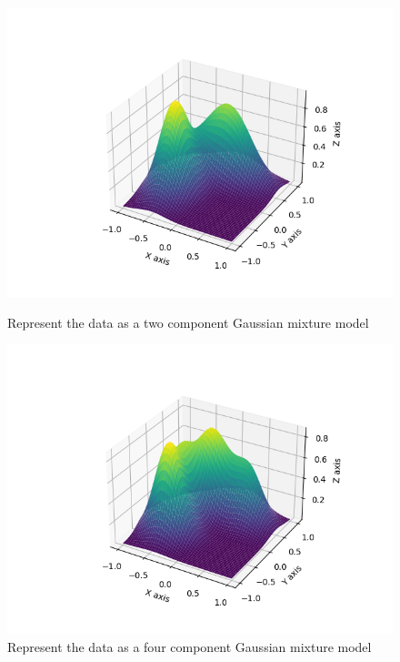 \documentclass{article}
\begin{document}
\begin{figure}[!htb]
\begin{minipage}{0.49\textwidth}
			\includegraphics[width=1\linewidth]{../q1to6pics/q6_2.png}
			\caption{Represent the data as a two component Gaussian mixture model}
	\end{minipage}\hfill
	\centering
	\begin{minipage}{0.49\textwidth}
			\centering
			\includegraphics[width=1\linewidth]{../q1to6pics/q6_4.png}
			\caption{Represent the data as a four component Gaussian mixture model}
	\end{minipage}\hfill
\end{figure}
\end{document}

